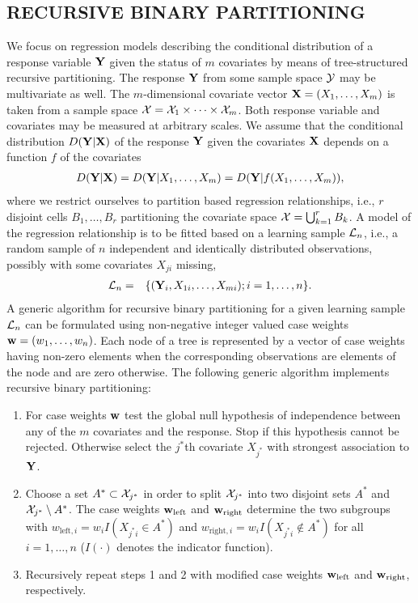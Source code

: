 
\begin{center}
\section{RECURSIVE BINARY PARTITIONING \label{algo}}
\end{center}

We focus on regression models describing the conditional distribution of a
response variable $\mathbf{Y}$ given the status of $m$ covariates by
means of tree-structured recursive partitioning. The response $\mathbf{Y}$ from some
sample space $\mathcal{Y}$ may be multivariate as well. 
The $m$-dimensional covariate vector $\mathbf{X} = (X_1, \dots, X_m)$ is taken 
from a sample space $\mathcal{X} = \mathcal{X}_1 \times \cdots \times \mathcal{X}_m$.
Both response variable and covariates may be measured
at arbitrary scales.
We assume that the conditional distribution $D(\mathbf{Y} | \mathbf{X})$ of the response 
$\mathbf{Y}$ given the covariates $\mathbf{X}$ depends on a function $f$ of the covariates
\begin{eqnarray*} 
D(\mathbf{Y} | \mathbf{X}) = D(\mathbf{Y} | X_1, \dots, X_m) = D(\mathbf{Y} | f( X_1, \dots,
X_m)),
\end{eqnarray*}
where we restrict ourselves to partition based regression relationships,
i.e., $r$ disjoint cells $B_1, \dots, B_r$ partitioning the covariate space $\mathcal{X}
= \bigcup_{k = 1}^r B_k$.
A model of the regression relationship is to be fitted based on a learning 
sample $\mathcal{L}_n$, i.e., a random sample of $n$ independent and
identically distributed observations, possibly with some covariates $X_{ji}$
missing,
\begin{eqnarray*}
\mathcal{L}_n & = & \{ (\mathbf{Y}_i, X_{1i}, \dots, X_{mi}); i = 1, \dots, n \}.
\end{eqnarray*}
A generic algorithm for recursive binary partitioning for a given learning
sample $\mathcal{L}_n$ can be formulated using non-negative integer valued case weights $\mathbf{w}
= (w_1, \dots, w_n)$. Each node of a tree is represented by a vector of
case weights having non-zero elements when the corresponding observations
are elements of the node and are zero otherwise. The following generic 
algorithm implements recursive binary partitioning:
\begin{enumerate}
\item For case weights $\mathbf{w}$ test the global null hypothesis of independence between
      any of the $m$ covariates and the response. Stop if this 
      hypothesis cannot be rejected. 
      Otherwise select the $j^*$th covariate $X_{j^*}$ with strongest 
      association to $\mathbf{Y}$.
\item Choose a set $A^* \subset \mathcal{X}_{j^*}$ in order to split $\mathcal{X}_{j^*}$ into
      two disjoint sets $A^*$ and $\mathcal{X}_{j^*} \setminus A^*$. 
      The case weights $\mathbf{w}_\text{left}$ and $\mathbf{w}_\text{right}$ determine the
      two subgroups with $w_{\text{left},i} = w_i I(X_{j^*i} \in A^*)$ and 
      $w_{\text{right},i} = w_i I(X_{j^*i} \not\in A^*)$ for all $i = 1,
      \dots, n$ ($I(\cdot)$ denotes the indicator function).
\item Recursively repeat steps 1 and 2 with modified case weights 
      $\mathbf{w}_\text{left}$ and $\mathbf{w}_\text{right}$, respectively.
\end{enumerate}

